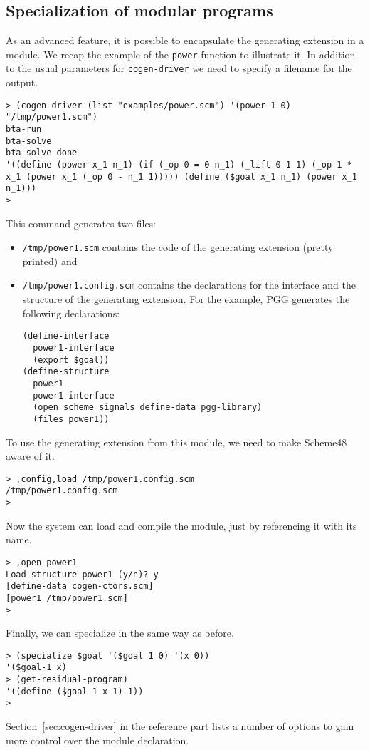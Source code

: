 \documentclass[11pt]{article}
\begin{document}
\subsection{Specialization of modular programs}
\label{sec:modular}

As an advanced feature, it is possible to encapsulate the generating extension
in a module. We recap the example of the \texttt{power} function to illustrate
it. In addition to the usual parameters for \texttt{cogen-driver} we need to
specify a filename for the output.
\begin{small}
\begin{verbatim}
> (cogen-driver (list "examples/power.scm") '(power 1 0) "/tmp/power1.scm")
bta-run
bta-solve
bta-solve done
'((define (power x_1 n_1) (if (_op 0 = 0 n_1) (_lift 0 1 1) (_op 1 * x_1 (power x_1 (_op 0 - n_1 1))))) (define ($goal x_1 n_1) (power x_1 n_1)))
>
\end{verbatim}
\end{small}
This command generates two files:
\begin{itemize}
\item \texttt{/tmp/power1.scm} contains the code of the generating extension
  (pretty printed) and
\item \texttt{/tmp/power1.config.scm} contains the declarations for the
  interface and the structure of the generating extension. For the example, PGG 
  generates the following declarations:
  \begin{small}
\begin{verbatim}
(define-interface
  power1-interface
  (export $goal))
(define-structure
  power1
  power1-interface
  (open scheme signals define-data pgg-library)
  (files power1))
\end{verbatim}
  \end{small}
\end{itemize}
To use the generating extension from this module, we need to make Scheme48
aware of it.
\begin{small}
\begin{verbatim}
> ,config,load /tmp/power1.config.scm
/tmp/power1.config.scm
> 
\end{verbatim}
\end{small}
Now the system can load and compile the module, just by referencing it with its 
name.
\begin{small}
\begin{verbatim}
> ,open power1
Load structure power1 (y/n)? y
[define-data cogen-ctors.scm]
[power1 /tmp/power1.scm]
> 
\end{verbatim}
\end{small}
Finally, we can specialize in the same way as before.
\begin{small}
\begin{verbatim}
> (specialize $goal '($goal 1 0) '(x 0))
'($goal-1 x)
> (get-residual-program)
'((define ($goal-1 x-1) 1))
> 
\end{verbatim}
\end{small}
Section~\ref{sec:cogen-driver} in the reference part lists a number of
options to gain more control over the module declaration.
\end{document}
